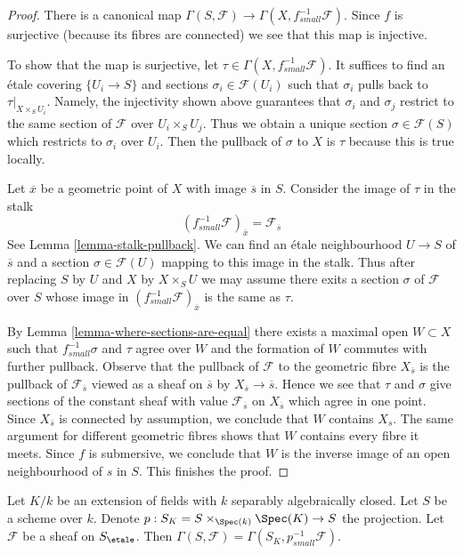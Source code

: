 \begin{proof}
There is a canonical map
$\Gamma(S, \mathcal{F}) \to \Gamma(X, f_{small}^{-1}\mathcal{F})$.
Since $f$ is surjective (because its fibres are connected) we see that
this map is injective.

\medskip\noindent
To show that the map is surjective, let
$\tau \in \Gamma(X, f_{small}^{-1}\mathcal{F})$.
It suffices to find
an \'etale covering $\{U_i \to S\}$ and
sections $\sigma_i \in \mathcal{F}(U_i)$
such that $\sigma_i$ pulls back to $\tau|_{X \times_S U_i}$.
Namely, the injectivity shown above guarantees
that $\sigma_i$ and $\sigma_j$ restrict to the same
section of $\mathcal{F}$ over $U_i \times_S U_j$.
Thus we obtain a unique section $\sigma \in \mathcal{F}(S)$
which restricts to $\sigma_i$ over $U_i$.
Then the pullback of $\sigma$ to $X$ is $\tau$
because this is true locally.

\medskip\noindent
Let $\overline{x}$ be a geometric point of $X$ with image $\overline{s}$
in $S$. Consider the image of $\tau$ in the stalk
$$
(f_{small}^{-1}\mathcal{F})_{\overline{x}} = \mathcal{F}_{\overline{s}}
$$
See Lemma \ref{lemma-stalk-pullback}.
We can find an \'etale neighbourhood $U \to S$ of $\overline{s}$
and a section $\sigma \in \mathcal{F}(U)$ mapping to this image
in the stalk. Thus after replacing $S$ by $U$ and $X$ by $X \times_S U$
we may assume there exits a section $\sigma$ of $\mathcal{F}$ over $S$
whose image in $(f_{small}^{-1}\mathcal{F})_{\overline{x}}$ is the
same as $\tau$.

\medskip\noindent
By Lemma \ref{lemma-where-sections-are-equal}
there exists a maximal open $W \subset X$ such that
$f_{small}^{-1}\sigma$ and $\tau$ agree over $W$
and the formation of $W$ commutes with further pullback.
Observe that the pullback of $\mathcal{F}$ to the
geometric fibre $X_{\overline{s}}$ is the pullback
of $\mathcal{F}_{\overline{s}}$ viewed as a sheaf on
$\overline{s}$ by $X_{\overline{s}} \to \overline{s}$.
Hence we see that $\tau$ and $\sigma$ give sections
of the constant sheaf with value $\mathcal{F}_{\overline{s}}$
on $X_{\overline{s}}$ which agree in one point. Since
$X_{\overline{s}}$ is connected by assumption, we conclude
that $W$ contains $X_s$. The same argument for different
geometric fibres shows that $W$ contains every fibre it meets.
Since $f$ is submersive, we conclude that $W$ is the inverse
image of an open neighbourhood of $s$ in $S$.
This finishes the proof.
\end{proof}

\begin{lemma}
\label{lemma-sections-base-field-extension}
Let $K/k$ be an extension of fields with $k$ separably
algebraically closed. Let $S$ be a scheme over $k$. Denote
$p : S_K = S \times_{\Spec(k)} \Spec(K) \to S$ the projection.
Let $\mathcal{F}$ be a sheaf on $S_\etale$.
Then $\Gamma(S, \mathcal{F}) = \Gamma(S_K, p^{-1}_{small}\mathcal{F})$.
\end{lemma}

